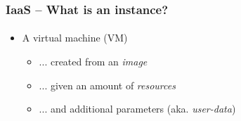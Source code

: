 \begin{frame}
\frametitle{IaaS -- What is an instance?}
\framesubtitle{}
\begin{itemize}
\item A virtual machine (VM)
  \begin{itemize}
  \item ... created from an \emph{image}
  \item ... given an amount of \emph{resources}
  \item ... and additional parameters (aka. \emph{user-data})
  \end{itemize}
\end{itemize}
\end{frame}

